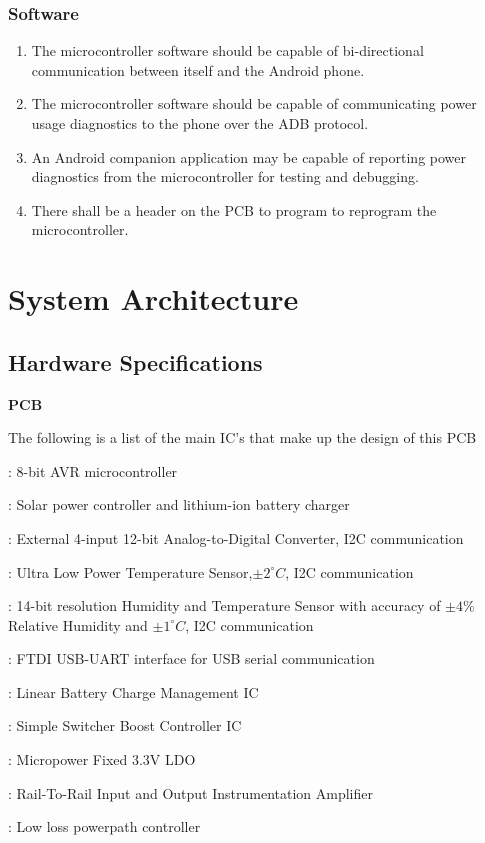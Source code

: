 \documentclass{article}
\begin{document}
{\begin{enumerate}[align=left,leftmargin=*, labelindent= 0em, label=\textbf{Requirement \thesubsubsection.\arabic*.}, itemindent=0em]
\end{enumerate}
\subsubsection{Software}
\begin{enumerate}[align=left,leftmargin=*, labelindent= 0em, label=\textbf{Requirement \thesubsubsection.\arabic*.}, itemindent=0em]
\item \label{SW1}The microcontroller software should be capable of bi-directional communication between itself and the Android phone.
\item \label{SW2}The microcontroller software should be capable of communicating power usage diagnostics to the phone over the ADB protocol.
\item \label{SW3}An Android companion application may be capable of reporting power diagnostics from the microcontroller for testing and debugging.
\item \label{SW4}There shall be a header on the PCB to program to reprogram the microcontroller.
\end{enumerate}

\section{System Architecture}
\subsection{Hardware Specifications}
\textbf{PCB}

The following is a list of the main IC’s that make up the design of this PCB
\begin{description}[font=$\bullet$\scshape\bfseries]
\item[Atmel ATMega328P]: 8-bit AVR microcontroller
\item[SPV1040 Max Point Power Tracker]: Solar power controller and lithium-ion battery charger
\item[ADS1015]: External 4-input 12-bit Analog-to-Digital Converter, I2C communication
\item[LM75BD]: Ultra Low Power Temperature Sensor,$\pm 2^{\circ}C$, I2C communication
\item[(Optional) HIH6130]: 14-bit resolution Humidity and Temperature Sensor with accuracy of $\pm4$\% Relative Humidity and $\pm 1^{\circ}C$, I2C communication
\item[FT230X]: FTDI USB-UART interface for USB serial communication
\item[bq2057CTS]: Linear Battery Charge Management IC 
\item[LM61428]: Simple Switcher Boost Controller IC
\item[SM72238]: Micropower Fixed 3.3V LDO
\item[LTC6800]: Rail-To-Rail Input and Output Instrumentation Amplifier
\item[LTC4412]: Low loss powerpath controller
\end{description}

}
\end{document}
